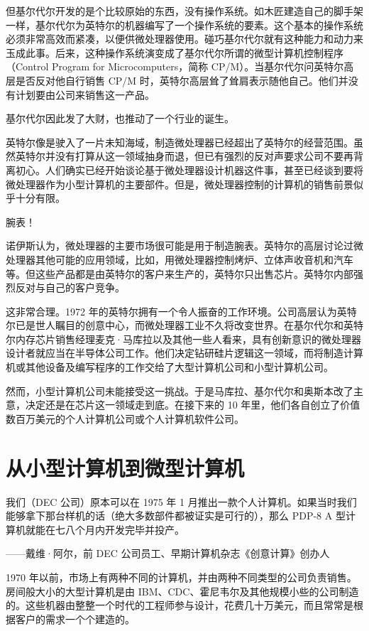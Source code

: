 \documentclass[12pt,UTF8]{ctexbook}
\begin{document}
但基尔代尔开发的是个比较原始的东西，没有操作系统。如木匠建造自己的脚手架一样，基尔代尔为英特尔的机器编写了一个操作系统的要素。这个基本的操作系统必须非常高效而紧凑，以便供微处理器使用。碰巧基尔代尔就有这种能力和动力来玉成此事。后来，这种操作系统演变成了基尔代尔所谓的微型计算机控制程序（Control Program for Microcomputers，简称 CP/M）。当基尔代尔问英特尔高层是否反对他自行销售 CP/M 时，英特尔高层耸了耸肩表示随他自己。他们并没有计划要由公司来销售这一产品。

基尔代尔因此发了大财，也推动了一个行业的诞生。

英特尔像是驶入了一片未知海域，制造微处理器已经超出了英特尔的经营范围。虽然英特尔并没有打算从这一领域抽身而退，但已有强烈的反对声要求公司不要再背离初心。人们确实已经开始谈论基于微处理器设计机器这件事，甚至已经谈到要将微处理器作为小型计算机的主要部件。但是，微处理器控制的计算机的销售前景似乎十分有限。

腕表！

诺伊斯认为，微处理器的主要市场很可能是用于制造腕表。英特尔的高层讨论过微处理器其他可能的应用领域，比如，用微处理器控制烤炉、立体声收音机和汽车等。但这些产品都是由英特尔的客户来生产的，英特尔只出售芯片。英特尔内部强烈反对与自己的客户竞争。

这非常合理。1972 年的英特尔拥有一个令人振奋的工作环境。公司高层认为英特尔已是世人瞩目的创意中心，而微处理器工业不久将改变世界。在基尔代尔和英特尔内存芯片销售经理麦克·马库拉以及其他一些人看来，具有创新意识的微处理器设计者就应当在半导体公司工作。他们决定钻研硅片逻辑这一领域，而将制造计算机或其他设备及编写程序的工作交给了大型计算机公司和小型计算机公司。

然而，小型计算机公司未能接受这一挑战。于是马库拉、基尔代尔和奥斯本改了主意，决定还是在芯片这一领域走到底。在接下来的 10 年里，他们各自创立了价值数百万美元的个人计算机公司或个人计算机软件公司。





\section{从小型计算机到微型计算机}


我们（DEC 公司）原本可以在 1975 年 1 月推出一款个人计算机。如果当时我们能够拿下那台样机的话（绝大多数部件都被证实是可行的），那么 PDP-8 A 型计算机就能在七八个月内开发完毕并投产。

——戴维·阿尔，前 DEC 公司员工、早期计算机杂志《创意计算》创办人



1970 年以前，市场上有两种不同的计算机，并由两种不同类型的公司负责销售。房间般大小的大型计算机是由 IBM、CDC、霍尼韦尔及其他规模小些的公司制造的。这些机器由整整一个时代的工程师参与设计，花费几十万美元，而且常常是根据客户的需求一个个建造的。
\end{document}
